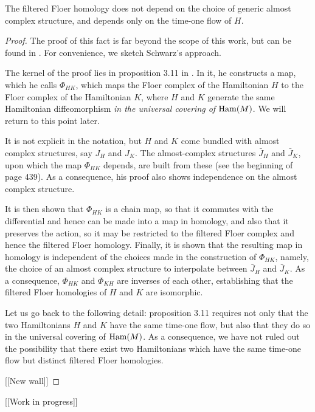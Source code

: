 \begin{prop}
The filtered Floer homology does not depend on the choice of generic almost complex structure, and depends only on the time-one flow of $H$.
\end{prop}

\begin{proof}
The proof of this fact is far beyond the scope of this work, but can be found in \cite{schwarz}. For convenience, we sketch Schwarz's approach.

The kernel of the proof lies in proposition 3.11 in \cite{schwarz}. In it, he constructs a map, which he calls $\Phi_{HK}$, which maps the Floer complex of the Hamiltonian $H$ to the Floer complex of the Hamiltonian $K$, where $H$ and $K$ generate the same Hamiltonian diffeomorphism \emph{in the universal covering of $\operatorname{Ham}(M)$}. We will return to this point later.

It is not explicit in the notation, but $H$ and $K$ come bundled with almost complex structures, say $J_H$ and $J_K$. The almost-complex structures $\bar J_H$ and $\bar J_K$, upon which the map $\Phi_{HK}$ depends, are built from these (see the beginning of page 439). As a consequence, his proof also shows independence on the almost complex structure.

It is then shown that $\Phi_{HK}$ is a chain map, so that it commutes with the differential and hence can be made into a map in homology, and also that it preserves the action, so it may be restricted to the filtered Floer complex and hence the filtered Floer homology. Finally, it is shown that the resulting map in homology is independent of the choices made in the construction of $\Phi_{HK}$, namely, the choice of an almost complex structure to interpolate between $\bar J_H$ and $\bar J_K$. As a consequence, $\Phi_{HK}$ and $\Phi_{KH}$ are inverses of each other, establishing that the filtered Floer homologies of $H$ and $K$ are isomorphic.

Let us go back to the following detail: proposition 3.11 requires not only that the two Hamiltonians $H$ and $K$ have the same time-one flow, but also that they do so in the universal covering of $\operatorname{Ham}(M)$. As a consequence, we have not ruled out the possibility that there exist two Hamiltonians which have the same time-one flow but distinct filtered Floer homologies. 

[[New wall]]
\end{proof}

[[Work in progress]]


